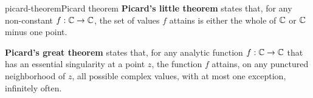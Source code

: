 
\begin{topic}{picard-theorem}{Picard theorem}
    \textbf{Picard's little theorem} states that, for any non-constant  $f : \mathbb{C} \to \mathbb{C}$, the set of values $f$ attains is either the whole of $\mathbb{C}$ or $\mathbb{C}$ minus one point.

    \textbf{Picard's great theorem} states that, for any analytic function $f : \mathbb{C} \to \mathbb{C}$ that has an essential singularity at a point $z$, the function $f$ attains, on any punctured neighborhood of $z$, all possible complex values, with at most one exception, infinitely often.
\end{topic}
